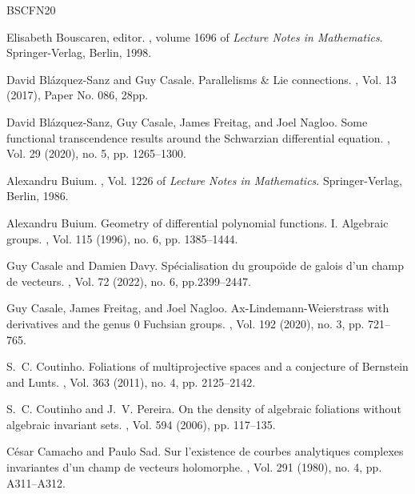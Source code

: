 \documentclass[12pt]{amsart}
\theoremstyle{definition}
\theoremstyle{plain}
\theoremstyle{exampstyle}
\theoremstyle{exampstyle}\newtheorem{thmxbis}{Theorem}
\numberwithin{equation}{section}
\theoremstyle{remark}
\begin{document}
\begin{thebibliography}{BSCFN20}

Elisabeth Bouscaren, editor.
, volume 1696 of {\em
  Lecture Notes in Mathematics}.
\newblock Springer-Verlag, Berlin, 1998.

David Bl\'{a}zquez-Sanz and Guy Casale.
\newblock Parallelisms \& {L}ie connections.
, Vol. 13 (2017), Paper No. 086, 28pp.

David Bl\'{a}zquez-Sanz, Guy Casale, James Freitag, and Joel Nagloo.
\newblock Some functional transcendence results around the {S}chwarzian
  differential equation.
, Vol. 29 (2020), no. 5, pp. 1265--1300.

Alexandru Buium.
,
 Vol. 1226 of {\em Lecture Notes in Mathematics}.
\newblock Springer-Verlag, Berlin, 1986.

Alexandru Buium.
\newblock Geometry of differential polynomial functions. {I}. {A}lgebraic
  groups.
, Vol. 115 (1996), no. 6, pp. 1385--1444.

Guy Casale and Damien Davy.
\newblock Sp\'{e}cialisation du groupo\"{\i}de de galois d'un champ de
  vecteurs.
, Vol. 72 (2022), no. 6, pp.2399--2447.

Guy Casale, James Freitag, and Joel Nagloo.
\newblock Ax-{L}indemann-{W}eierstrass with derivatives and the genus 0
  {F}uchsian groups.
, Vol. 192 (2020), no. 3, pp. 721--765.

S.~C. Coutinho.
\newblock Foliations of multiprojective spaces and a conjecture of {B}ernstein
  and {L}unts.
, Vol. 363 (2011), no. 4, pp. 2125--2142.

S.~C. Coutinho and J.~V. Pereira.
\newblock On the density of algebraic foliations without algebraic invariant
  sets.
, Vol. 594 (2006), pp. 117--135.

C\'{e}sar Camacho and Paulo Sad.
\newblock Sur l'existence de courbes analytiques complexes invariantes d'un
  champ de vecteurs holomorphe.
, Vol. 291 (1980), no. 4, pp. A311--A312.


\end{thebibliography}
\end{document}
